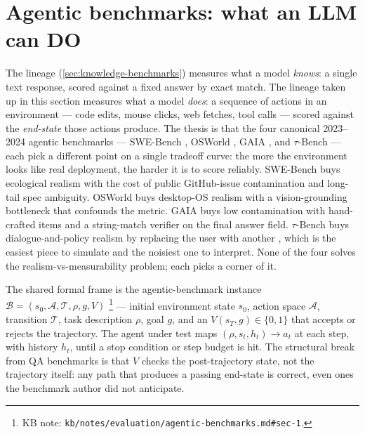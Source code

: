 
\section{Agentic benchmarks: what an LLM can DO}
\label{sec:agentic-benchmarks}

The  lineage (\cref{sec:knowledge-benchmarks}) measures what a model
\emph{knows}: a single text response, scored against a fixed answer 
by exact match. The lineage taken up in this section measures what a
model \emph{does}: a sequence of actions in an environment --- code
edits, mouse clicks, web fetches, tool calls --- scored against the
\emph{end-state} those actions produce. The thesis is that the four
canonical 2023--2024 agentic benchmarks --- SWE-Bench
\citep{jimenez2024-swebench}, OSWorld \citep{xie2024-osworld}, GAIA
\citep{mialon2023-gaia}, and $\tau$-Bench \citep{yao2024-tau-bench}
--- each pick a different point on a single tradeoff curve: the more
the environment looks like real deployment, the harder it is to score
reliably. SWE-Bench buys ecological realism with the cost of public
GitHub-issue contamination and long-tail spec ambiguity. OSWorld buys
desktop-OS realism with a vision-grounding bottleneck that confounds
the metric. GAIA buys low contamination with hand-crafted items and
a string-match verifier on the final answer field. $\tau$-Bench buys
dialogue-and-policy realism by replacing the user with another ,
which is the easiest piece to simulate and the noisiest one to
interpret. None of the four solves the realism-vs-measurability
problem; each picks a corner of it.

The shared formal frame is the agentic-benchmark instance
$\mathcal{B} = (s_0, \mathcal{A}, \mathcal{T}, \rho, g, V)$%
\footnote{KB note: \nolinkurl{kb/notes/evaluation/agentic-benchmarks.md#sec-1}.}
--- initial environment state $s_0$, action space $\mathcal{A}$,
transition $\mathcal{T}$, task description $\rho$, goal $g$, and an
 $V(s_T, g) \in \{0, 1\}$ that accepts or rejects
the trajectory. The agent under test maps $(\rho, s_t, h_t) \to a_t$
at each step, with history $h_t$, until a stop condition or step
budget is hit. The structural break from QA benchmarks is that $V$
checks the post-trajectory state, not the trajectory itself: any path
that produces a passing end-state is correct, even ones the
benchmark author did not anticipate.

